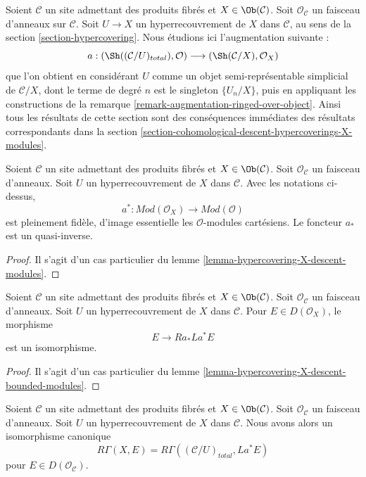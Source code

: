 \noindent
Soient $\mathcal{C}$ un site admettant des produits fibrés et $X \in \Ob(\mathcal{C})$.
Soit $\mathcal{O}_\mathcal{C}$ un faisceau d'anneaux sur $\mathcal{C}$.
Soit $U \to X$ un hyperrecouvrement de $X$ dans $\mathcal{C}$, au sens de la
section \ref{section-hypercovering}. Nous étudions ici l'augmentation
suivante :
$$
a :
(\Sh((\mathcal{C}/U)_{total}), \mathcal{O})
\longrightarrow
(\Sh(\mathcal{C}/X), \mathcal{O}_X)
$$
que l'on obtient en considérant $U$ comme un objet semi-représentable simplicial
de $\mathcal{C}/X$, dont le terme de degré $n$ est le singleton
$\{U_n/X\}$, puis en appliquant les constructions de la
remarque \ref{remark-augmentation-ringed-over-object}.
Ainsi tous les résultats de cette section sont des conséquences immédiates
des résultats correspondants dans la section
\ref{section-cohomological-descent-hypercoverings-X-modules}.

\begin{lemma}
\label{lemma-hypercovering-X-simple-descent-modules}
Soient $\mathcal{C}$ un site admettant des produits fibrés et $X \in \Ob(\mathcal{C})$.
Soit $\mathcal{O}_\mathcal{C}$ un faisceau d'anneaux.
Soit $U$ un hyperrecouvrement de $X$ dans $\mathcal{C}$. Avec les notations ci-dessus,
$$
a^* : \textit{Mod}(\mathcal{O}_X) \to \textit{Mod}(\mathcal{O})
$$
est pleinement fidèle, d'image essentielle les $\mathcal{O}$-modules cartésiens.
Le foncteur $a_*$ est un quasi-inverse.
\end{lemma}

\begin{proof}
Il s'agit d'un cas particulier du lemme
\ref{lemma-hypercovering-X-descent-modules}.
\end{proof}

\begin{lemma}
\label{lemma-hypercovering-X-simple-descent-bounded-modules}
Soient $\mathcal{C}$ un site admettant des produits fibrés et $X \in \Ob(\mathcal{C})$.
Soit $\mathcal{O}_\mathcal{C}$ un faisceau d'anneaux.
Soit $U$ un hyperrecouvrement de $X$ dans $\mathcal{C}$. Pour
$E \in D(\mathcal{O}_X)$, le morphisme
$$
E \longrightarrow Ra_*La^*E
$$
est un isomorphisme.
\end{lemma}

\begin{proof}
Il s'agit d'un cas particulier du lemme
\ref{lemma-hypercovering-X-descent-bounded-modules}.
\end{proof}

\begin{lemma}
\label{lemma-compare-cohomology-hypercovering-X-simple-modules}
Soient $\mathcal{C}$ un site admettant des produits fibrés et $X \in \Ob(\mathcal{C})$.
Soit $\mathcal{O}_\mathcal{C}$ un faisceau d'anneaux.
Soit $U$ un hyperrecouvrement de $X$ dans $\mathcal{C}$.
Nous avons alors un isomorphisme canonique
$$
R\Gamma(X, E) = R\Gamma((\mathcal{C}/U)_{total}, La^*E)
$$
pour $E \in D(\mathcal{O}_\mathcal{C})$.
\end{lemma}

